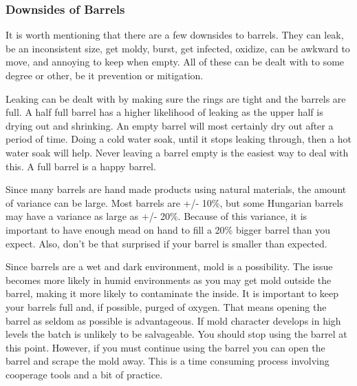  \subsubsection{Downsides of Barrels}
   It is worth mentioning that there are a few downsides to barrels. They can leak, be an inconsistent size,
   get moldy, burst, get infected, oxidize, can be awkward to move, and annoying to keep when empty.
   All of these can be dealt with to some degree or other, be it prevention or mitigation.

   Leaking can be dealt with by making sure the rings are tight and the barrels are full. A half full barrel has
   a higher likelihood of leaking as the upper half is drying out and shrinking. An empty barrel will most
   certainly dry out after a period of time. Doing a cold water soak, until it stops leaking through, then 
   a hot water soak will help. Never leaving a barrel empty is the easiest way to deal with this. A full
   barrel is a happy barrel.

   Since many barrels are hand made products using natural materials, the amount of variance can be large.
   Most barrels are +/- 10\%, but some Hungarian barrels may have a variance as large as +/- 20\%.
   Because of this variance, it is important to have enough mead on hand to fill a 20\% bigger barrel than you expect.
   Also, don't be that surprised if your barrel is smaller than expected.

   Since barrels are a wet and dark environment, mold is a possibility. The issue becomes more likely in humid
   environments as you may get mold outside the barrel, making it more likely to contaminate the inside.
   It is important to keep your barrels full and, if possible, purged of oxygen.
   That means opening the barrel as seldom as possible is advantageous.
   If mold character develops in high levels the batch is unlikely to be salvageable. You should stop using the barrel
   at this point. However, if you must continue using the barrel you can open the barrel and scrape the mold away.
   This is a time consuming process involving cooperage tools and a bit of practice.


